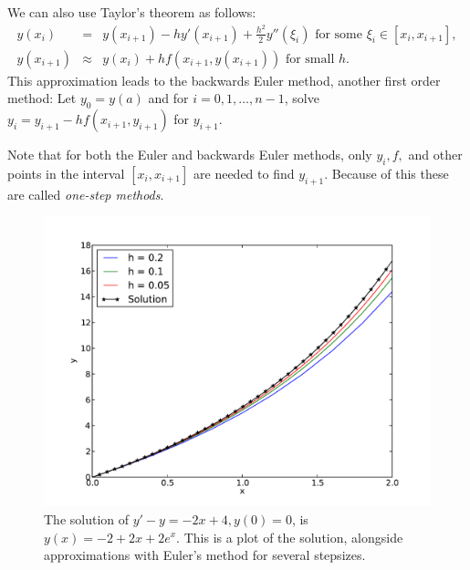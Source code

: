 We can also use Taylor's theorem as follows: 
\begin{eqnarray*}
y(x_{i}) &=& y(x_{i+1}) - h y'(x_{i+1}) + \frac{h^2}{2} y''(\xi_i) \text{ for some } \xi_i \in [x_i,x_{i+1}], \\
y(x_{i+1}) &\approx & y(x_{i}) + h f(x_{i+1},y(x_{i+1}))  \text{ for small } h .
\end{eqnarray*}
This approximation leads to the backwards Euler method, another first order method: Let $y_0 = y(a)$ and for $i = 0, 1, \hdots, n-1$, solve  $y_{i} = y_{i+1}-hf(x_{i+1},y_{i+1})$ for $y_{i+1}$.

Note that for both the Euler and backwards Euler methods, only $y_i, f, $ and other points in the interval $[x_i, x_{i+1}]$ are needed to find $y_{i+1}$. Because of this these are called \textit{one-step methods}. 




\begin{figure}[ht]
\centering
\includegraphics[width=\textwidth]{Fig1.pdf}
\caption{The solution of $y' -y= -2x+4, y(0) = 0$, is $y(x) = -2+2x + 2e^x.$ This is a plot of the solution, alongside approximations with Euler's method for several stepsizes.}
\label{ivp:euler}
\end{figure}


